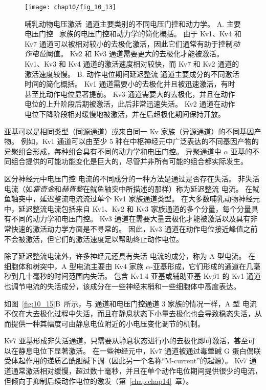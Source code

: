 \begin{figure}[htbp]
	\centering
	\texttt{[image: chap10/fig\_10\_13]}
	\caption{哺乳动物电压激活~通道主要类别的不同电压门控和动力学。
		A. 主要电压门控~ 家族的电压门控和动力学的简化概括。
		由于 Kv1、Kv4 和 Kv7 通道可以被相对较小的去极化激活，因此它们通常有助于控制\textit{动作电位}阈值。
		Kv2 和 Kv3 通道需要更大的去极化才能被激活。
		Kv1、Kv3 和 Kv4 通道的激活速度相对较快，而 Kv7 和 Kv2 通道的激活速度较慢。
		B. 动作电位期间延迟整流  通道主要成分的不同激活时间的简化概括。
		Kv1 通道需要小的去极化并且被迅速激活，有时甚至比动作电位显著提前。
		Kv3 通道需要大的去极化，并且在动作电位的上升阶段后期被激活，此后非常迅速失活。
		Kv2 通道在动作电位下降阶段相对缓慢地被激活，并在后超极化期间保持开放\cite{johnston2010symposium}。}
	\label{fig:10_13}
\end{figure}


亚基可以是相同类型（同源通道）或来自同一 Kv 家族（异源通道）的不同基因产物。
例如，Kv1 通道可以由至少 5 种在中枢神经元中广泛表达的不同基因产物的异聚组合形成，每种组合具有不同的动力学和电压门控。
异聚通道中 $\alpha$ 亚基的不同组合提供的可能功能变化是巨大的，尽管并非所有可能的组合都实际发生。


区分神经元中电压门控  电流的不同成分的一种方法是通过是否存在失活。
非失活  电流（如\textit{霍奇金}和\textit{赫胥黎}在鱿鱼轴突中所描述的那样）称为延迟整流  电流。
在鱿鱼轴突中，延迟整流电流流过单个 Kv1 家族通道类型。
在大多数哺乳动物神经元中，延迟整流电流包括来自 Kv1、Kv2 和 Kv3 家族通道的多个分量，每个分量具有不同的动力学和电压门控。
Kv3 通道在需要大量去极化才能被激活以及具有非常快速的激活动力学方面是不寻常的。
因此，Kv3 通道在动作电位接近峰值之前不会被激活，但它们的激活速度足以帮助终止动作电位。


除了延迟整流电流外，许多神经元还具有失活  电流的成分，称为 A 型电流。
在细胞体和树突中，A 型电流主要由 Kv4 家族 $\alpha$-亚基形成，它们形成的通道在几毫秒到几十毫秒的时间范围内失活。
包含 Kv1.4 亚基或辅助亚基 Kv$\beta$1 的 Kv1 通道也调节电流的失活成分，该成分在一些神经末梢和一些细胞体中高度表达。


如图~\ref{fig:10_15}B~所示，与  通道和电压门控通道 3 家族的情况一样，A 型  电流不仅在大去极化过程中失活，而且在静息状态下小量去极化也会导致稳态失活，从而提供一种其幅度可由静息电位附近的小电压变化调节的机制。


Kv7 亚基形成非失活通道，只需要从静息状态进行小的去极化即可激活，甚至可以在静息电位下显著激活。
在一些神经元中，Kv7 通道被通过毒蕈碱 G 蛋白偶联受体起作用的递质乙酰胆碱下调（因此另一个名称“M-current”的起源）。
Kv7 通道通常激活相对缓慢，超过数十毫秒，并且在单个动作电位期间提供很少的电流，但倾向于抑制后续动作电位的激发（第~\ref{chap:chap14}~章）。


